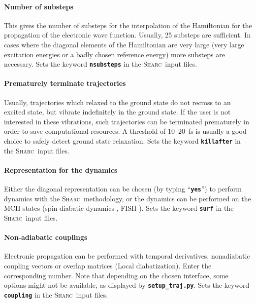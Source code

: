 \documentclass[a4paper,10pt,DIV=15,openany,twoside=false]{scrbook}
\newcommand{\sharc}{\textsc{Sharc}}
\newcommand{\ttt}[1]{\textbf{\texttt{#1}}}
\begin{document}
\paragraph{Number of substeps}

This gives the number of substeps for the interpolation of the Hamiltonian for the propagation of the electronic wave function. Usually, 25 substeps are sufficient. In cases where the diagonal elements of the Hamiltonian are very large (very large excitation energies or a badly chosen reference energy) more substeps are necessary. Sets the keyword \ttt{nsubsteps} in the \sharc\ input files.

\paragraph{Prematurely terminate trajectories}

Usually, trajectories which relaxed to the ground state do not recross to an excited state, but vibrate indefinitely in the ground state. If the user is not interested in these vibrations, such trajectories can be terminated prematurely in order to save computational resources. A threshold of 10--20~fs is usually a good choice to safely detect ground state relaxation. Sets the keyword \ttt{killafter} in the \sharc\ input files.

\paragraph{Representation for the dynamics}

Either the diagonal representation can be chosen (by typing ``\ttt{yes}'') to perform dynamics with the \sharc\ methodology, or the dynamics can be performed on the MCH states (spin-diabatic dynamics \cite{Granucci2012JCP}, FISH \cite{Mitric2009PRA}). Sets the keyword \ttt{surf} in the \sharc\ input files.

\paragraph{Non-adiabatic couplings}

Electronic propagation can be performed with temporal derivatives, nonadiabatic coupling vectors or overlap matrices (Local diabatization). Enter the corresponding number. Note that depending on the chosen interface, some options might not be available, as displayed by \ttt{setup\_traj.py}. Sets the keyword \ttt{coupling} in the \sharc\ input files.
\end{document}

